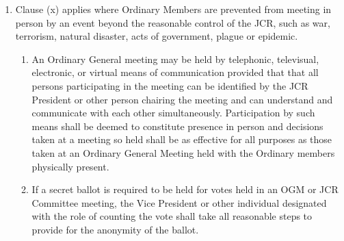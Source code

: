\documentclass[11pt,a4paper, oneside]{memoir}
\begin{document}
\begin{enumerate}
		\item \label{Cl:OGM-Disaster} Clause (x) applies where Ordinary Members are prevented from meeting in person by an event beyond the reasonable control of the JCR, such as war, terrorism, natural disaster, acts of government, plague or epidemic.
		\begin{enumerate}
			\item An Ordinary General meeting may be held by telephonic, televisual, electronic, or virtual means of communication provided that that all persons participating in the meeting can be identified by the JCR President or other person chairing the meeting and can understand and communicate with each other simultaneously.  Participation by such means shall be deemed to constitute presence in person and decisions taken at a meeting so held shall be as effective for all purposes as those taken at an Ordinary General Meeting held with the Ordinary members physically present.
			\item If a secret ballot is required to be held for votes held in an OGM or JCR Committee meeting, the Vice President or other individual designated with the role of counting the vote shall take all reasonable steps to provide for the anonymity of the ballot.
		\end{enumerate}
	\end{enumerate}
\end{document}
